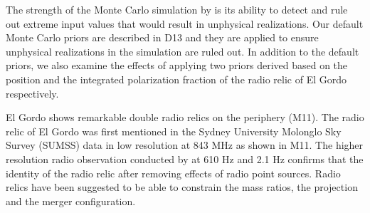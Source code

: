 The strength of the Monte Carlo simulation by  is its ability
to detect and rule out extreme input values that would result in
unphysical realizations. 
Our default Monte Carlo priors are described in D13 and they are applied to ensure 
unphysical realizations in the simulation are ruled out. 
In addition to the default priors, we also examine the effects of applying 
two priors derived based on the position and the integrated polarization
fraction of the radio relic of El Gordo respectively. 

El Gordo shows remarkable double radio relics on the periphery
(M11). The radio relic  of El Gordo was first mentioned in the Sydney University
Molonglo Sky Survey (SUMSS) data in low resolution at 843 MHz
\citep{Mauch03} as shown in M11. The higher resolution radio observation
conducted by \cite{L13} at 610 \mega Hz and 2.1 \giga Hz confirms that
the identity of the radio relic after removing effects of radio point sources.
Radio relics have been suggested to be able to constrain the
mass ratios, the projection and the merger configuration.
\citep{vanWeeren10} 



